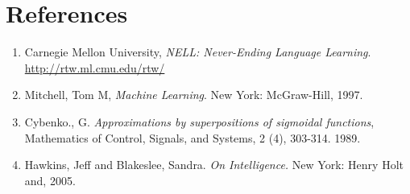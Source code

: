 \documentclass[12pt]{article}  %
\begin{document}
\section{References}


\begin{enumerate}

\item Carnegie Mellon University, \emph{NELL: Never-Ending Language Learning}. \url{http://rtw.ml.cmu.edu/rtw/}\label{NELL}

\item Mitchell, Tom M, \emph{Machine Learning}. New York: McGraw-Hill, 1997.\label{Mitchell}

\item Cybenko., G. \emph{Approximations by superpositions of sigmoidal functions}, Mathematics of Control, Signals, and Systems, 2 (4), 303-314. 1989. \label{Cybenko}

\item Hawkins, Jeff and Blakeslee, Sandra. \emph{On Intelligence.} New York: Henry Holt and, 2005. \label{Hawkins}


\end{enumerate}
\end{document}

